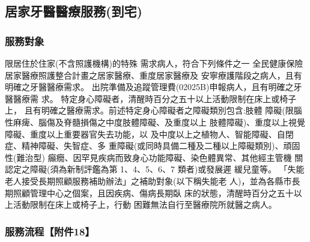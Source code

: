 
\subsection{居家牙醫醫療服務(到宅)}

\subsubsection{服務對象}
\begin{outline}
\0 限居住於住家(不含照護機構)的特殊 需求病人，符合下列條件之一
    \1 全民健康保險居家醫療照護整合計畫之居家醫療、重度居家醫療及
    安寧療護階段之病人，且有明確之牙醫醫療需求。
    \1 出院準備及追蹤管理費(02025B)申報病人，且有明確之牙醫醫療需
求。
    \1 特定身心障礙者，清醒時百分之五十以上活動限制在床上或椅子上，
且有明確之醫療需求。前述特定身心障礙者之障礙類別包含:肢體 障礙(限腦性麻痺、腦傷及脊髓損傷之中度肢體障礙、及重度以上 肢體障礙)、重度以上視覺障礙、重度以上重要器官失去功能，以 及中度以上之植物人、智能障礙、自閉症、精神障礙、失智症、多 重障礙(或同時具備二種及二種以上障礙類別)、頑固性(難治型) 癲癇、因罕見疾病而致身心功能障礙、染色體異常、其他經主管機 關認定之障礙(須為新制評鑑為第 1、4、5、6、7 類者)或發展遲 緩兒童等。
    \1 「失能老人接受長期照顧服務補助辦法」之補助對象(以下稱失能老 人)，並為各縣市長期照顧管理中心之個案，且因疾病、傷病長期臥 床的狀態，清醒時百分之五十以上活動限制在床上或椅子上，行動 困難無法自行至醫療院所就醫之病人。

\end{outline}

\subsubsection{服務流程【附件18】}
\label{certificate}
\setlength{\tabcolsep}{8pt}

